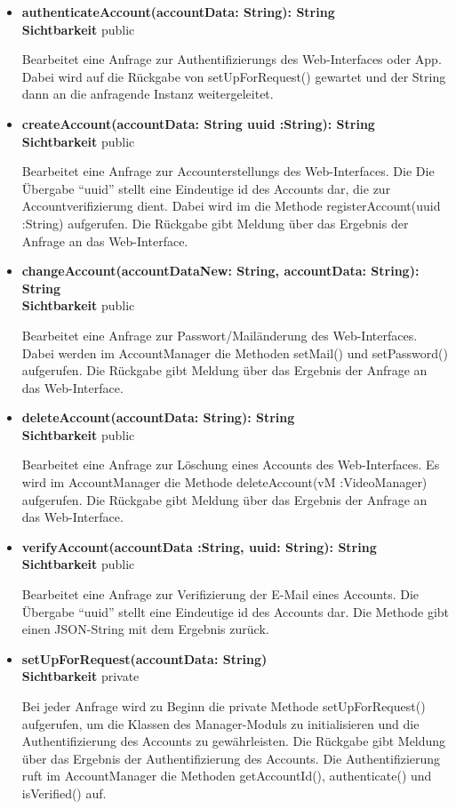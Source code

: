 \begin{itemize}
\item \textbf{authenticateAccount(accountData: String): String}\hfill\\
\textbf{Sichtbarkeit} public

Bearbeitet eine Anfrage zur Authentifizierungs des Web-Interfaces oder App. Dabei wird auf die Rückgabe von setUpForRequest() gewartet und der String dann an die anfragende Instanz weitergeleitet.

\item \textbf{createAccount(accountData: String uuid :String): String}\hfill\\
\textbf{Sichtbarkeit} public

Bearbeitet eine Anfrage zur Accounterstellungs des Web-Interfaces. Die Die Übergabe ``uuid'' stellt eine Eindeutige id des Accounts dar, die zur Accountverifizierung dient. Dabei wird im  die Methode registerAccount(uuid :String) aufgerufen. Die Rückgabe gibt Meldung über das Ergebnis der Anfrage an das Web-Interface.

\item \textbf{changeAccount(accountDataNew: String, accountData: String): String}\hfill\\
\textbf{Sichtbarkeit} public

Bearbeitet eine Anfrage zur Passwort/Mailänderung des Web-Interfaces. Dabei werden im AccountManager die Methoden setMail() und setPassword()  aufgerufen. Die Rückgabe gibt Meldung über das Ergebnis der Anfrage an das Web-Interface.

\item \textbf{deleteAccount(accountData: String): String}\hfill\\
\textbf{Sichtbarkeit} public

Bearbeitet eine Anfrage zur Löschung eines Accounts des Web-Interfaces. Es wird im AccountManager die Methode deleteAccount(vM :VideoManager) aufgerufen. Die Rückgabe gibt Meldung über das Ergebnis der Anfrage an das Web-Interface.

\item \textbf{verifyAccount(accountData :String, uuid: String): String}\hfill\\
\textbf{Sichtbarkeit} public

Bearbeitet eine Anfrage zur Verifizierung der E-Mail eines Accounts. Die Übergabe ``uuid'' stellt eine Eindeutige id des Accounts dar. Die Methode gibt einen JSON-String mit dem Ergebnis zurück.

\item \textbf{setUpForRequest(accountData: String)}\hfill\\
\textbf{Sichtbarkeit} private

Bei jeder Anfrage wird zu Beginn die private Methode setUpForRequest() aufgerufen, um die Klassen des Manager-Moduls zu initialisieren und die Authentifizierung des Accounts zu gewährleisten. Die Rückgabe gibt Meldung über das Ergebnis der Authentifizierung des Accounts. Die Authentifizierung ruft im AccountManager die Methoden getAccountId(), authenticate() und isVerified() auf.
\end{itemize}